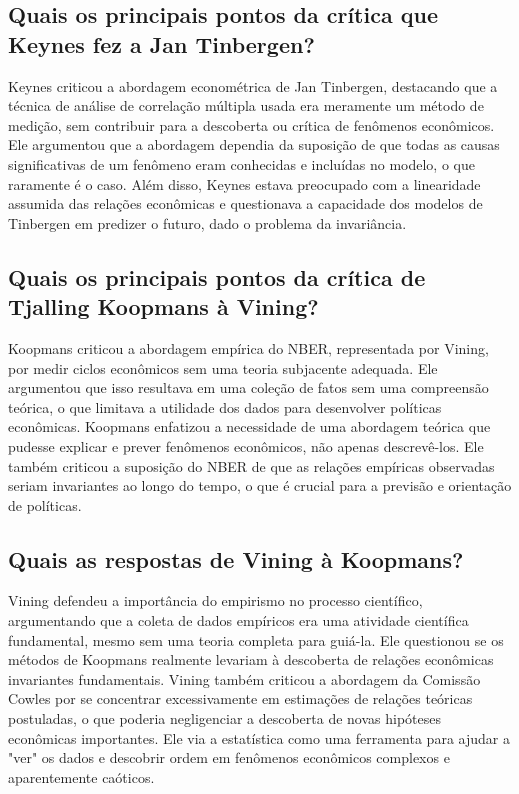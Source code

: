 \documentclass[a4paper,12pt]{article}[abntex2]
\begin{document}
\subsection{\textbf{Quais os principais pontos da crítica que Keynes fez a Jan Tinbergen?}}
Keynes criticou a abordagem econométrica de Jan Tinbergen, destacando que a técnica de análise de correlação múltipla usada era meramente um método de medição, sem contribuir para a descoberta ou crítica de fenômenos econômicos. Ele argumentou que a abordagem dependia da suposição de que todas as causas significativas de um fenômeno eram conhecidas e incluídas no modelo, o que raramente é o caso. Além disso, Keynes estava preocupado com a linearidade assumida das relações econômicas e questionava a capacidade dos modelos de Tinbergen em predizer o futuro, dado o problema da invariância.

\subsection{\textbf{Quais os principais pontos da crítica de Tjalling Koopmans à Vining?}}
Koopmans criticou a abordagem empírica do NBER, representada por Vining, por medir ciclos econômicos sem uma teoria subjacente adequada. Ele argumentou que isso resultava em uma coleção de fatos sem uma compreensão teórica, o que limitava a utilidade dos dados para desenvolver políticas econômicas. Koopmans enfatizou a necessidade de uma abordagem teórica que pudesse explicar e prever fenômenos econômicos, não apenas descrevê-los. Ele também criticou a suposição do NBER de que as relações empíricas observadas seriam invariantes ao longo do tempo, o que é crucial para a previsão e orientação de políticas.

\subsection{\textbf{Quais as respostas de Vining à Koopmans?}}
Vining defendeu a importância do empirismo no processo científico, argumentando que a coleta de dados empíricos era uma atividade científica fundamental, mesmo sem uma teoria completa para guiá-la. Ele questionou se os métodos de Koopmans realmente levariam à descoberta de relações econômicas invariantes fundamentais. Vining também criticou a abordagem da Comissão Cowles por se concentrar excessivamente em estimações de relações teóricas postuladas, o que poderia negligenciar a descoberta de novas hipóteses econômicas importantes. Ele via a estatística como uma ferramenta para ajudar a "ver" os dados e descobrir ordem em fenômenos econômicos complexos e aparentemente caóticos.
\end{document}
